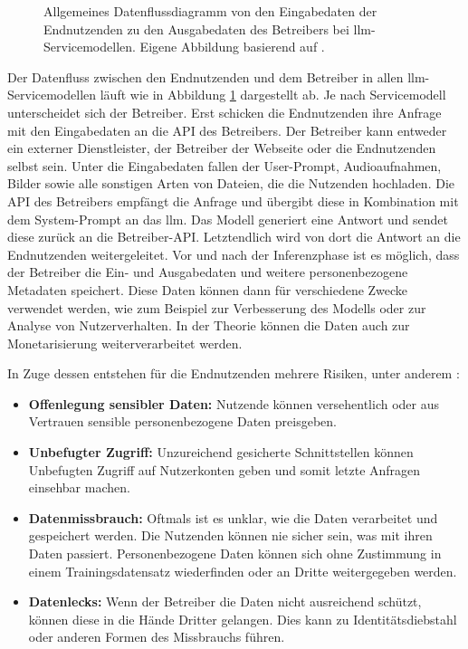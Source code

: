 \begin{figure}[H]
    \centering 
    
    \caption[Allgemeines Datenflussdiagramm von den Eingabedaten der Endnutzenden zu den Ausgabedaten des Betreibers bei LLM-Servicemodellen.]{Allgemeines Datenflussdiagramm von den Eingabedaten der Endnutzenden zu den Ausgabedaten des Betreibers bei \ac{llm}-Servicemodellen. Eigene Abbildung basierend auf \cite{llm-privacy}.}
    \label{fig:llm_dataflow}
\end{figure}

Der Datenfluss zwischen den Endnutzenden und dem Betreiber in allen \ac{llm}-Servicemodellen läuft wie in Abbildung \ref{fig:llm_dataflow} dargestellt ab. Je nach Servicemodell unterscheidet sich der Betreiber. Erst schicken die Endnutzenden ihre Anfrage mit den Eingabedaten an die API des Betreibers. Der Betreiber kann entweder ein externer Dienstleister, der Betreiber der Webseite oder die Endnutzenden selbst sein. Unter die Eingabedaten fallen der User-Prompt, Audioaufnahmen, Bilder sowie alle sonstigen Arten von Dateien, die die Nutzenden hochladen. Die API des Betreibers empfängt die Anfrage und übergibt diese in Kombination mit dem System-Prompt an das \ac{llm}. Das Modell generiert eine Antwort und sendet diese zurück an die Betreiber-API. Letztendlich wird von dort die Antwort an die Endnutzenden weitergeleitet. Vor und nach der Inferenzphase ist es möglich, dass der Betreiber die Ein- und Ausgabedaten und weitere personenbezogene Metadaten speichert. Diese Daten können dann für verschiedene Zwecke verwendet werden, wie zum Beispiel zur Verbesserung des Modells oder zur Analyse von Nutzerverhalten. In der Theorie können die Daten auch zur Monetarisierung weiterverarbeitet werden. \cite{llm-privacy}

In Zuge dessen entstehen für die Endnutzenden mehrere Risiken, unter anderem \cite{llm-privacy}:
\begin{itemize}
    \item \textbf{Offenlegung sensibler Daten:} Nutzende können versehentlich oder aus Vertrauen sensible personenbezogene Daten preisgeben. 
    \item \textbf{Unbefugter Zugriff:} Unzureichend gesicherte Schnittstellen können Unbefugten Zugriff auf Nutzerkonten geben und somit letzte Anfragen einsehbar machen.
    \item \textbf{Datenmissbrauch:} Oftmals ist es unklar, wie die Daten verarbeitet und gespeichert werden. Die Nutzenden können nie sicher sein, was mit ihren Daten passiert. Personenbezogene Daten können sich ohne Zustimmung in einem Trainingsdatensatz wiederfinden oder an Dritte weitergegeben werden.
    \item \textbf{Datenlecks:} Wenn der Betreiber die Daten nicht ausreichend schützt, können diese in die Hände Dritter gelangen. Dies kann zu Identitätsdiebstahl oder anderen Formen des Missbrauchs führen.
\end{itemize}

